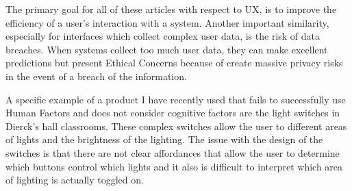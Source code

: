 \documentclass[12pt]{article}
\begin{document}
The primary goal for all of these articles with  respect to UX, is to improve the efficiency of a user's interaction with a system.
Another important similarity, especially for interfaces which collect complex user data, is the risk of data breaches. When systems
collect too much user data, they can make excellent predictions but present Ethical Concerns because of
create massive privacy risks in the event of a breach of the information.

A specific example of a product I have recently used that fails to successfully use Human Factors and does not consider cognitive
factors are the light switches in Dierck's hall classrooms. These complex switches allow the user to different areas of lights and
the brightness of the lighting. The issue with the design of the switches is that there are not clear affordances that allow the
user to determine which buttons control which lights and it also is difficult to interpret which area of lighting is actually toggled on.
\end{document}
